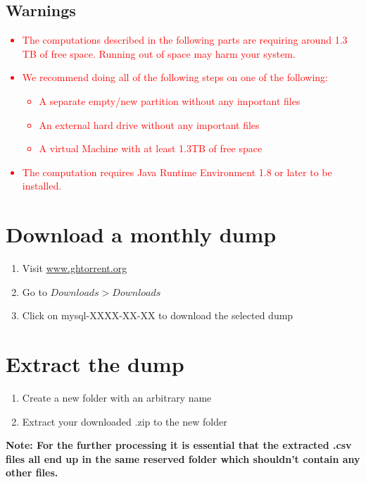 \documentclass[11pt]{article}
\begin{document}
\subsection{Warnings}
\textcolor{red}{
\begin{itemize}
\item The computations described in the following parts are requiring around 1.3 TB of free space. Running out of space may harm your system.
\item We recommend doing all of the following steps on one of the following: 
\begin{itemize}
\item A separate empty/new partition without any important files
\item An external hard drive without any important files
\item A virtual Machine with at least 1.3TB of free space
\end{itemize}
\item The computation requires Java Runtime Environment 1.8 or later to be installed.
\end{itemize}
}
\newpage


\newpage

\section{Download a monthly dump}
\begin{enumerate}
\item Visit \url{www.ghtorrent.org}
\item Go to $Downloads > Downloads$
\item Click on mysql-XXXX-XX-XX to download the selected dump
\end{enumerate}
\section{Extract the dump}
\begin{enumerate}
\item Create a new folder with an arbitrary name
\item Extract your downloaded .zip to the new folder
\end{enumerate}
\textbf{Note: For the further processing it is essential that the extracted .csv files all end up in the same reserved folder which shouldn't contain any other files. 
}
\end{document}

